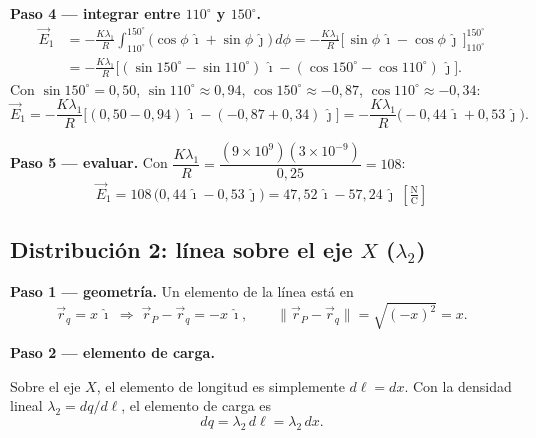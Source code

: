 \documentclass[12pt,letterpaper]{article}
\newcommand{\ii}{\hat{\imath}}
\newcommand{\jj}{\hat{\jmath}}
\begin{document}
\noindent\textbf{Paso 4 — integrar entre $110^\circ$ y $150^\circ$.}
\begin{align*}
    \vec{E}_1 &= -\frac{K\lambda_1}{R}\int_{110^\circ}^{150^\circ}\big(\cos\phi\,\ii + \sin\phi\,\jj\big)\,d\phi
    = -\frac{K\lambda_1}{R}\Big[\,\sin\phi\,\ii - \cos\phi\,\jj\,\Big]_{110^\circ}^{150^\circ}\\
    &= -\frac{K\lambda_1}{R}\Big[(\sin150^\circ - \sin110^\circ)\,\ii - (\cos150^\circ - \cos110^\circ)\,\jj\Big].
\end{align*}
Con $\sin150^\circ = 0{,}50$, $\sin110^\circ \approx 0{,}94$, $\cos150^\circ \approx -0{,}87$, $\cos110^\circ \approx -0{,}34$:
\[
    \vec{E}_1 = -\frac{K\lambda_1}{R}\big[(0{,}50-0{,}94)\,\ii - (-0{,}87+0{,}34)\,\jj\big]
    = -\frac{K\lambda_1}{R}\big(-0{,}44\,\ii + 0{,}53\,\jj\big).
\]

\noindent\textbf{Paso 5 — evaluar.} Con $\dfrac{K\lambda_1}{R} = \dfrac{(9\times10^{9})(3\times10^{-9})}{0{,}25} = 108$:
\[
    \boxed{\vec{E}_1 = 108\,\big(0{,}44\,\ii - 0{,}53\,\jj\big) = 47{,}52\,\ii - 57{,}24\,\jj\ \left[\tfrac{\text{N}}{\text{C}}\right]}
\]

\subsection*{Distribuci\'on 2: l\'inea sobre el eje $X$ ($\lambda_2$)}

\noindent\textbf{Paso 1 — geometr\'ia.} Un elemento de la l\'inea est\'a en
\[
    \vec{r}_q = x\,\ii
    \;\Rightarrow\;
    \vec{r}_P - \vec{r}_q = -x\,\ii,\qquad
    \lVert \vec{r}_P - \vec{r}_q\rVert = \sqrt{(-x)^2} = x.
\]

\noindent\textbf{Paso 2 — elemento de carga.}

\noindent
\begin{minipage}[c]{0.42\textwidth}
\centering
{}
\end{minipage}%
\hfill
\begin{minipage}[c]{0.54\textwidth}
Sobre el eje $X$, el elemento de longitud es simplemente $d\ell = dx$. Con la densidad lineal
$\lambda_2 = dq/d\ell$, el elemento de carga es
\[
    dq = \lambda_2\,d\ell = \lambda_2\,dx.
\]
\end{minipage}
\end{document}
